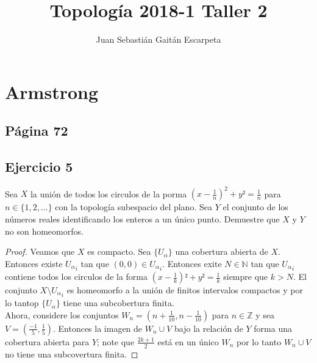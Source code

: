\documentclass[letterpaper]{article}
\title{Topolog\'ia 2018-1 Taller 2 }
\author{Juan Sebasti\'an Gait\'an Escarpeta}
\begin{document}
\maketitle
\section{Armstrong}
\subsection*{P\'agina 72}
\subsection*{Ejercicio 5}
Sea $X$ la uni\'on de todos los circulos de la porma $(x-\frac{1}{n})^2+y²=\frac{1}{n}$ para $n \in \{1,2,...\}$ con la topolog\'ia subespacio del plano. Sea $Y$ el conjunto de los n\'umeros reales identificando los enteros a un \'unico punto. Demuestre que $X$ y $Y$ no son homeomorfos.
\begin{proof}
Veamos que $X$ es compacto. Sea $\{U_\alpha\}$ una cobertura abierta de $X$. Entonces existe ${U_\alpha}_i$ tan que $(0,0)\in {U_\alpha}_i$. Entonces exite $N \in \mathbb{N}$ tan que ${U_\alpha}_i$ contiene todos los circulos de la forma $(x-\frac{1}{k})²+y² = \frac{1}{k}$ siempre que $k > N$. El conjunto $X\setminus{U_\alpha}_i$ es homeomorfo a la uni\'on de finitos intervalos compactos y por lo tantop $\{U_\alpha\} $ tiene una subcobertura finita.\\
Ahora, considere los conjuntos $W_n = (n+ \frac{1}{10}, n-\frac{1}{10})$ para $n\in \mathbb{Z}$ y sea $V =(\frac{-1}{5},\frac{1}{5})$. Entonces la imagen de $W_n \cup V$ bajo la relaci\'on de $Y$ forma una cobertura abierta para $Y$; note que $\frac{2k+1}{2}$ est\'a en un \'unico $W_n$ por lo tanto $W_n \cup V$ no tiene una subcovertura finita.
\end{proof}
\end{document}
